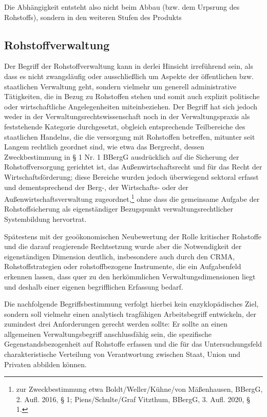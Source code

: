 \documentclass[12pt,a4paper,oneside]{book} %
\begin{document}
	Die Abhängigkeit entsteht also nicht beim Abbau (bzw. dem Urpsrung des Rohstoffs), sondern in den weiteren Stufen des Produkts
	
	\subsection{Rohstoffverwaltung}
	
	Der Begriff der Rohstoffverwaltung kann in derlei Hinsicht irreführend sein, als dass es nicht zwangsläufig oder ausschließlich um Aspekte der öffentlichen bzw. staatlichen Verwaltung geht, sondern vielmehr um generell administrative Tätigkeiten, die in Bezug zu Rohstoffen stehen und somit auch explizit politische oder wirtschaftliche Angelegenheiten miteinbeziehen. Der Begriff hat sich jedoch weder in der Verwaltungsrechtswissenschaft noch in der Verwaltungspraxis als feststehende Kategorie durchgesetzt, obgleich entsprechende Teilbereiche des staatlichen Handelns, die die versorgung mit Rohstoffen betreffen, mitunter seit Langem rechtlich geordnet sind, wie etwa das Bergrecht, dessen Zweckbestimmung in § 1 Nr. 1 BBergG ausdrücklich auf die Sicherung der Rohstoffversorgung gerichtet ist, das Außenwirtschaftsrecht und für das Recht der Wirtschaftsförderung; diese Bereiche wurden jedoch überwiegend sektoral erfasst und dementsprechend der Berg-, der Wirtschafts- oder der Außenwirtschaftsverwaltung zugeordnet,\footnote{zur Zweckbestimmung etwa Boldt/Weller/Kühne/von Mäßenhausen, BBergG, 2. Aufl. 2016, § 1; Piens/Schulte/Graf Vitzthum, BBergG, 3. Aufl. 2020, § 1.} ohne dass die gemeinsame Aufgabe der Rohstoffsicherung als eigenständiger Bezugspunkt verwaltungsrechtlicher Systembildung hervortrat.
	
	Spätestens mit der geoökonomischen Neubewertung der Rolle kritischer Rohstoffe und die darauf reagierende Rechtsetzung wurde aber die Notwendigkeit der eigenständigen Dimension deutlich, insbesondere auch durch den CRMA, Rohstoffstrategien oder rohstoffbezogene Instrumente, die ein Aufgabenfeld erkennen lassen, dass quer zu den herkömmlichen Verwaltungsdimensionen liegt und deshalb einer eigenen begrifflichen Erfassung bedarf.
	
	Die nachfolgende Begriffsbestimmung verfolgt hierbei kein enzyklopädisches Ziel, sondern soll vielmehr einen analytisch tragfähigen Arbeitsbegriff entwickeln, der zumindest drei Anforderungen gerecht werden sollte: Er sollte an einen allgemeinen Verwaltungsbegriff anschlussfähig sein, die spezifische Gegenstandsbezogenheit auf Rohstoffe erfassen und die für das Untersuchungsfeld charakteristische Verteilung von Verantwortung zwischen Staat, Union und Privaten abbilden können.
	
\end{document}
